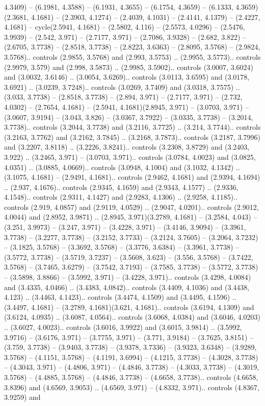 4.3409) -- (6.1981, 4.3588) -- (6.1931, 4.3655) -- (6.1754, 4.3659) -- (6.1333, 4.3659)(2.3681, 4.1681) -- (2.3903, 4.1274) -- (2.4039, 4.1031) -- (2.4141, 4.1379) -- (2.4227, 4.1681) -- cycle(2.5941, 4.1681) -- (2.5802, 4.116) -- (2.5573, 4.0296) -- (2.5476, 3.9939) -- (2.542, 3.971) -- (2.7177, 3.971) -- (2.7086, 3.9328) -- (2.682, 3.822) -- (2.6705, 3.7738) -- (2.8518, 3.7738) -- (2.8223, 3.6363) -- (2.8095, 3.5768) -- (2.9824, 3.5768).. controls (2.9855, 3.5768) and (2.993, 3.5753) .. (2.9955, 3.5773).. controls (2.9979, 3.579) and (2.998, 3.5873) .. (2.9985, 3.5902).. controls (3.0007, 3.6024) and (3.0032, 3.6146) .. (3.0054, 3.6269).. controls (3.0113, 3.6595) and (3.0178, 3.6921) .. (3.0239, 3.7248).. controls (3.0269, 3.7409) and (3.0318, 3.7575) .. (3.033, 3.7738) -- (2.8518, 3.7738) -- (2.894, 3.971) -- (2.7177, 3.971) -- (2.732, 4.0302) -- (2.7654, 4.1681) -- (2.5941, 4.1681)(2.8945, 3.971) -- (3.0703, 3.971) -- (3.0607, 3.9194) -- (3.043, 3.826) -- (3.0367, 3.7922) -- (3.0335, 3.7738) -- (3.2014, 3.7738).. controls (3.2044, 3.7738) and (3.2116, 3.7725) .. (3.214, 3.7744).. controls (3.2163, 3.7762) and (3.2162, 3.7845) .. (3.2168, 3.7873).. controls (3.2187, 3.7996) and (3.2207, 3.8118) .. (3.2226, 3.8241).. controls (3.2308, 3.8729) and (3.2403, 3.922) .. (3.2465, 3.971) -- (3.0703, 3.971).. controls (3.0784, 4.0023) and (3.0825, 4.0351) .. (3.0885, 4.0669).. controls (3.0948, 4.1004) and (3.1032, 4.1342) .. (3.1075, 4.1681) -- (2.9491, 4.1681).. controls (2.9462, 4.1681) and (2.9394, 4.1694) .. (2.937, 4.1676).. controls (2.9345, 4.1659) and (2.9343, 4.1577) .. (2.9336, 4.1548).. controls (2.9311, 4.1427) and (2.9283, 4.1306) .. (2.9258, 4.1185).. controls (2.919, 4.0857) and (2.9119, 4.0529) .. (2.9047, 4.0201).. controls (2.9012, 4.0044) and (2.8952, 3.9871) .. (2.8945, 3.971)(3.2789, 4.1681) -- (3.2584, 4.043) -- (3.251, 3.9973) -- (3.247, 3.971) -- (3.4228, 3.971) -- (3.4146, 3.9094) -- (3.3961, 3.7738) -- (3.2277, 3.7738) -- (3.2152, 3.7733) -- (3.2124, 3.7605) -- (3.2064, 3.7232) -- (3.1825, 3.5768) -- (3.3692, 3.5768) -- (3.3776, 3.6384) -- (3.3961, 3.7738) -- (3.5772, 3.7738) -- (3.5719, 3.7237) -- (3.5608, 3.623) -- (3.556, 3.5768) -- (3.7422, 3.5768) -- (3.7465, 3.6279) -- (3.7542, 3.7193) -- (3.7585, 3.7738) -- (3.5772, 3.7738) -- (3.5898, 3.8866) -- (3.5992, 3.971) -- (3.4228, 3.971).. controls (3.4298, 4.0084) and (3.4335, 4.0466) .. (3.4383, 4.0842).. controls (3.4409, 4.1036) and (3.4438, 4.123) .. (3.4463, 4.1423).. controls (3.4474, 4.1509) and (3.4495, 4.1596) .. (3.4497, 4.1681) -- (3.2789, 4.1681)(3.621, 4.1681).. controls (3.6194, 4.1309) and (3.6124, 4.0935) .. (3.6087, 4.0564).. controls (3.6068, 4.0384) and (3.6046, 4.0203) .. (3.6027, 4.0023).. controls (3.6016, 3.9922) and (3.6015, 3.9814) .. (3.5992, 3.9716) -- (3.6176, 3.971) -- (3.7755, 3.971) -- (3.771, 3.9184) -- (3.7625, 3.8151) -- (3.759, 3.7738) -- (3.9403, 3.7738) -- (3.9378, 3.7336) -- (3.9323, 3.6348) -- (3.9289, 3.5768) -- (4.1151, 3.5768) -- (4.1191, 3.6994) -- (4.1215, 3.7738) -- (4.3028, 3.7738) -- (4.3043, 3.971) -- (4.4806, 3.971) -- (4.4846, 3.7738) -- (4.3033, 3.7738) -- (4.3019, 3.5768) -- (4.4885, 3.5768) -- (4.4846, 3.7738) -- (4.6658, 3.7738).. controls (4.6658, 3.8396) and (4.6569, 3.9053) .. (4.6569, 3.971) -- (4.8332, 3.971).. controls (4.8367, 3.9259) and 